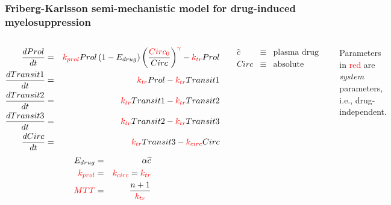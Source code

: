 \documentclass[handout]{beamer}
\begin{document}
\begin{frame}
  \frametitle{Friberg-Karlsson semi-mechanistic model for
drug-induced myelosuppression}

\begin{columns}
\begin{footnotesize}
  \begin{eqnarray*}
    \frac{dProl}{dt} &=& \textcolor{red}{k_{prol}}Prol\left(1 -
      E_{drug}\right)\left(\frac{\textcolor{red}{Circ_0}}{Circ}\right)^{\textcolor{red}{\gamma}} -
    \textcolor{red}{k_{tr}}Prol \\
\frac{dTransit1}{dt} &=& \textcolor{red}{k_{tr}}Prol - \textcolor{red}{k_{tr}}Transit1 \\
\frac{dTransit2}{dt} &=& \textcolor{red}{k_{tr}}Transit1 - \textcolor{red}{k_{tr}}Transit2 \\
\frac{dTransit3}{dt} &=& \textcolor{red}{k_{tr}}Transit2 - \textcolor{red}{k_{tr}}Transit3 \\
\frac{dCirc}{dt} &=& \textcolor{red}{k_{tr}}Transit3 - \textcolor{red}{k_{circ}}Circ \\
  \end{eqnarray*}
\vspace{-0.25in}
  \begin{eqnarray*}
    E_{drug} &=& \alpha \widehat{c} \\
\textcolor{red}{k_{prol}} &=& \textcolor{red}{k_{circ}} = \textcolor{red}{k_{tr}} \\
\textcolor{red}{MTT} &=& \frac{n + 1}{\textcolor{red}{k_{tr}}}
  \end{eqnarray*}
\end{footnotesize}
\begin{footnotesize}
\begin{eqnarray*}
  \widehat{c} &\equiv& \text{plasma drug concentration} \\
Circ &\equiv& \text{absolute neutrophil count (ANC)}
\end{eqnarray*}
\end{footnotesize}
 
Parameters in \textcolor{red}{red} are {\em system} parameters, i.e., drug-independent.
\end{columns}

\end{frame}
\end{document}
